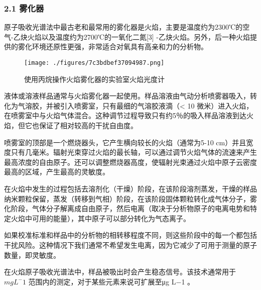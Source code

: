 \subsubsection{2.1 雾化器}

原子吸收光谱法中最古老和最常用的雾化器是火焰，主要是温度约为2300℃的空气-乙炔火焰以及温度约为2700℃的一氧化二氮[3] -乙炔火焰。另外，后一种火焰提供的雾化环境还原性更强，非常适合对氧具有高亲和力的分析物。

\begin{figure}[ht]
\centering
\texttt{[image: ./figures/7c3bdbef37094987.png]}
\caption{使用丙烷操作火焰雾化器的实验室火焰光度计} \label{fig_AAS_3}
\end{figure}

液体或溶液样品通常与火焰雾化器一起使用。样品溶液由气动分析喷雾器吸入，转化为气溶胶，并被引入喷雾室，只有最细的气溶胶液滴（< 10 微米）进入火焰，在喷雾室中与火焰气体混合。这种调节过程导致只有约5％的吸入样品溶液到达火焰，但它也保证了相对较高的干扰自由度。

喷雾室的顶部是一个燃烧器头，它产生横向较长的火焰（通常为5-10 cm）并且宽度只有几毫米。辐射光束穿过火焰的最长轴，可以通过调节火焰气体的流速来产生最高浓度的自由原子。还可以调整燃烧器高度，使辐射光束通过火焰中原子云密度最高的区域，产生最高的灵敏度。

在火焰中发生的过程包括去溶剂化（干燥）阶段，在该阶段溶剂蒸发，干燥的样品纳米颗粒保留，蒸发（转移到气相）阶段，在该阶段固体颗粒转化成气体分子，雾化阶段，气体分子解离成自由原子，然后电离（取决于分析物原子的电离电势和特定火焰中可用的能量），其中原子可以部分转化为气态离子。

如果校准标准和样品中的分析物的相转移程度不同，则这些阶段中的每一个都包括干扰风险。这种情况下我们通常不希望发生电离，因为它减少了可用于测量的原子数量，即灵敏度。

在火焰原子吸收光谱法中，样品被吸出时会产生稳态信号。该技术通常用于$mg L^−1$ 范围内的测定，对于某些元素来说可扩展至μg L−1 。
